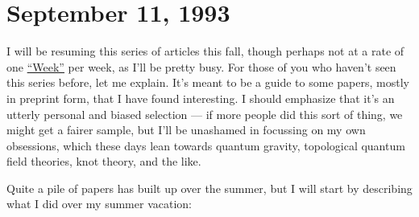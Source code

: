 \documentclass[12pt]{article}
\begin{document}
\hypertarget{week18}{%
\section{September 11, 1993}\label{week18}}

I will be resuming this series of articles this fall, though perhaps not
at a rate of one \protect\hyperlink{week}{``Week''} per week, as I'll be
pretty busy. For those of you who haven't seen this series before, let
me explain. It's meant to be a guide to some papers, mostly in preprint
form, that I have found interesting. I should emphasize that it's an
utterly personal and biased selection --- if more people did this sort
of thing, we might get a fairer sample, but I'll be unashamed in
focussing on my own obsessions, which these days lean towards quantum
gravity, topological quantum field theories, knot theory, and the like.

Quite a pile of papers has built up over the summer, but I will start by
describing what I did over my summer vacation:
\end{document}
